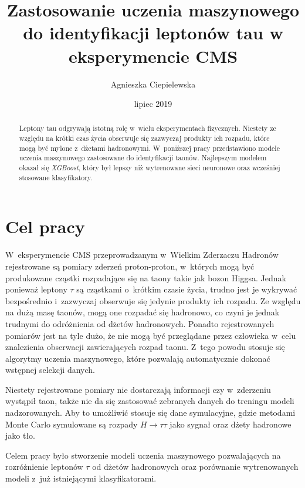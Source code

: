 \documentclass{pracalicmgr}
\author{Agnieszka Ciepielewska}
\title{Zastosowanie uczenia maszynowego do identyfikacji leptonów tau w eksperymencie CMS}
\date{lipiec 2019}
\begin{document}
    \maketitle
    \let\cleardoublepage\clearpage
    
    \begin{abstract}
    Leptony tau	odgrywają istotną rolę w~wielu eksperymentach fizycznych. Niestety ze względu na krótki czas życia obserwuje się zazwyczaj produkty ich rozpadu, które mogą być mylone z~dżetami hadronowymi. W~poniższej pracy przedstawiono modele uczenia maszynowego zastosowane do identyfikacji taonów. Najlepszym modelem okazał się \textit{XGBoost}, który był lepszy niż wytrenowane sieci neuronowe oraz wcześniej stosowane klasyfikatory.

    \end{abstract}

    \tableofcontents
    
    \chapter*{Cel pracy}
    W~eksperymencie CMS przeprowadzanym w~Wielkim Zderzaczu Hadronów rejestrowane są pomiary zderzeń proton-proton, w~których mogą być produkowane cząstki rozpadające się na taony takie jak bozon Higgsa. Jednak ponieważ leptony $\tau$ są cząstkami o~krótkim czasie życia, trudno jest je wykrywać bezpośrednio i~zazwyczaj obserwuje się jedynie produkty ich rozpadu. Ze względu na dużą masę taonów, mogą one rozpadać się hadronowo, co czyni je jednak trudnymi do odróżnienia od dżetów hadronowych. Ponadto rejestrowanych pomiarów jest na tyle dużo, że nie mogą być przeglądane przez człowieka w~celu znalezienia obserwacji zawierających rozpad taonu. Z~tego powodu stosuje się algorytmy uczenia maszynowego, które pozwalają automatycznie dokonać wstępnej selekcji danych.
    
    Niestety rejestrowane pomiary nie dostarczają informacji czy w~zderzeniu wystąpił taon, także nie da się zastosować zebranych danych do treningu modeli nadzorowanych. Aby to umożliwić stosuje się dane symulacyjne, gdzie metodami Monte Carlo symulowane są rozpady $H \rightarrow \tau\tau$ jako sygnał oraz dżety hadronowe jako tło.
    
    Celem pracy było stworzenie modeli uczenia maszynowego pozwalających na rozróżnienie leptonów $\tau$ od dżetów hadronowych oraz porównanie wytrenowanych modeli z~już istniejącymi klasyfikatorami.
    
\end{document}
